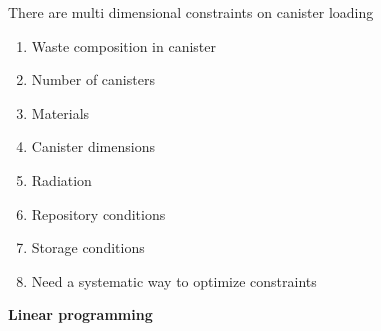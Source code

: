 \documentclass[aspectratio=1610,pdftex,dvipsnames,compress,xcolor={dvipsnames}]{beamer}
\begin{document}
\begin{frame}{There are multi dimensional constraints on canister loading}
    \begin{enumerate}[series=outerlist,topsep=0pt,itemsep=21pt,leftmargin=*,label=(\arabic*)]
        \item[]Waste composition in canister
        \item[]Number of canisters
        \item[]Materials
        \item[]Canister dimensions
        \item[]Radiation
        \item[]Repository conditions
        \item[]Storage conditions
            \vspace{0.15in}
        \item[]Need a systematic way to optimize constraints
    \end{enumerate}
\end{frame}


\begin{frame}[plain]{}
    \centering\Large\textbf{Linear programming}
\end{frame}
\end{document}
